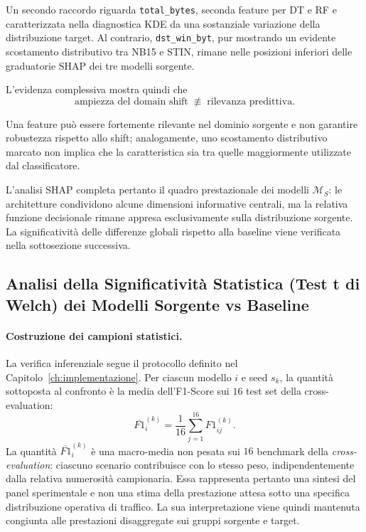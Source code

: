 Un secondo raccordo riguarda \texttt{total\_bytes}, seconda feature per DT e RF e caratterizzata nella diagnostica KDE da una sostanziale variazione della distribuzione target. 
Al contrario, \texttt{dst\_win\_byt}, pur mostrando un evidente scostamento distributivo tra NB15 e STIN, rimane nelle posizioni inferiori delle graduatorie SHAP dei tre modelli sorgente.

L'evidenza complessiva mostra quindi che
\[
    \text{ampiezza del domain shift}
    \;\not\equiv\;
    \text{rilevanza predittiva}.
\]

Una feature può essere fortemente rilevante nel dominio sorgente e non garantire robustezza rispetto allo shift; analogamente, uno scostamento distributivo marcato non implica che la caratteristica sia tra quelle maggiormente utilizzate dal classificatore.

L'analisi SHAP completa pertanto il quadro prestazionale dei modelli $\mathcal{M}_{S}$: le architetture condividono alcune dimensioni informative centrali, ma la relativa funzione decisionale rimane appresa esclusivamente sulla distribuzione sorgente. 
La significatività delle differenze globali rispetto alla baseline viene verificata nella sottosezione successiva.



\subsection{Analisi della Significatività Statistica (Test t di Welch) dei Modelli Sorgente vs Baseline}
\label{subsec:sorgente_welch_ttest}

\paragraph{Costruzione dei campioni statistici.}
La verifica inferenziale segue il protocollo definito nel Capitolo~\ref{ch:implementazione}. 
Per ciascun modello $i$ e seed $s_k$, la quantità sottoposta al confronto è la media dell'F1-Score sui $16$ test set della cross-evaluation:
\begin{equation}
    \overline{F1}_{i}^{(k)}
    =
    \frac{1}{16}
    \sum_{j=1}^{16}
    F1_{ij}^{(k)}.
    \label{eq:cap5_f1_seed_mean_source}
\end{equation}
La quantità $\overline{F1}_{i}^{(k)}$ è una macro-media non pesata sui $16$ benchmark della \textit{cross-evaluation}: ciascuno scenario contribuisce con lo stesso peso, indipendentemente dalla relativa numerosità campionaria. Essa rappresenta pertanto una sintesi del panel sperimentale e non una stima della prestazione attesa sotto una specifica distribuzione operativa di traffico. La sua interpretazione viene quindi mantenuta congiunta alle prestazioni disaggregate sui gruppi sorgente e target.

